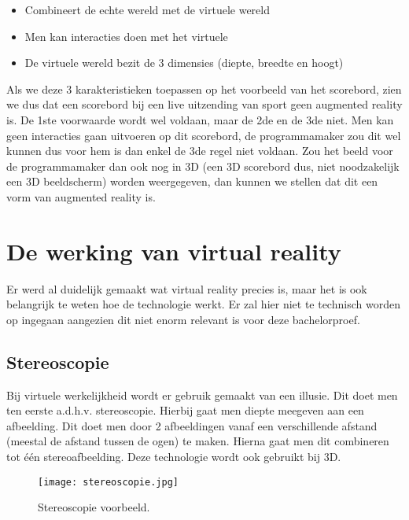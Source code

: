 \begin{itemize}
	\item Combineert de echte wereld met de virtuele wereld
	\item Men kan interacties doen met het virtuele
	\item De virtuele wereld bezit de 3 dimensies (diepte, breedte en hoogt)
\end{itemize}

Als we deze 3 karakteristieken toepassen op het voorbeeld van het scorebord, zien we dus dat een scorebord bij een live uitzending van sport geen augmented reality is. De 1ste voorwaarde wordt wel voldaan, maar de 2de en de 3de niet. Men kan geen interacties gaan uitvoeren op dit scorebord, de programmamaker zou dit wel kunnen dus voor hem is dan enkel de 3de regel niet voldaan. Zou het beeld voor de programmamaker dan ook nog in 3D (een 3D scorebord dus, niet noodzakelijk een 3D beeldscherm) worden weergegeven, dan kunnen we stellen dat dit een vorm van augmented reality is.


\section{De werking van virtual reality}
\label{sec:hoe-werkt-vr}
Er werd al duidelijk gemaakt wat virtual reality precies is, maar het is ook belangrijk te weten hoe de technologie werkt. Er zal hier niet te technisch worden op ingegaan aangezien dit niet enorm relevant is voor deze bachelorproef.

\subsection{Stereoscopie}
\label{subsec:stereoscopie}
Bij virtuele werkelijkheid wordt er gebruik gemaakt van een illusie. Dit doet men ten eerste a.d.h.v. stereoscopie. Hierbij gaat men diepte meegeven aan een afbeelding. Dit doet men door 2 afbeeldingen vanaf een verschillende afstand (meestal de afstand tussen de ogen) te maken. Hierna gaat men dit combineren tot één stereoafbeelding. Deze technologie wordt ook gebruikt bij 3D. 

\begin{figure}
	\centering
	\texttt{[image: stereoscopie.jpg]}
	\caption{Stereoscopie voorbeeld.}
	\label{fig:stereoscopie}
\end{figure}


